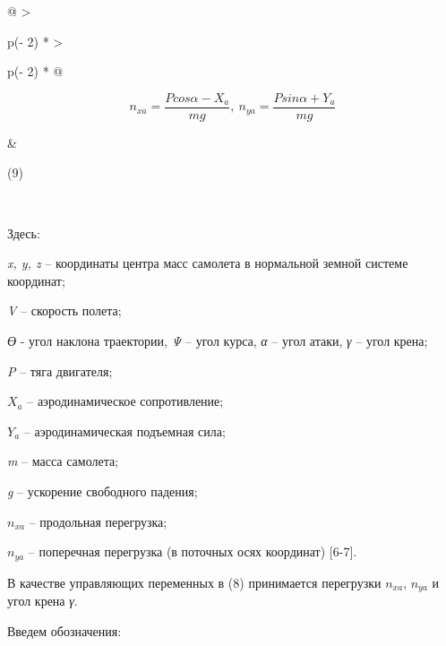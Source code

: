 \begin{longtable}[]{@{}
  >{\raggedright\arraybackslash}p{(\columnwidth - 2\tabcolsep) * }
  >{\raggedright\arraybackslash}p{(\columnwidth - 2\tabcolsep) * }@{}}
\toprule\noalign{}
\begin{minipage}[b]{\linewidth}\raggedright
\[n_{xa} = \frac{Pcos\alpha - X_{a}}{mg},\ n_{ya} = \frac{Psin\alpha + Y_{a}}{mg}\]
\end{minipage} & \begin{minipage}[b]{\linewidth}\raggedright
(9)
\end{minipage} \\
\midrule\noalign{}
\endhead
\bottomrule\noalign{}
\endlastfoot
\end{longtable}

Здесь:

\emph{x, y, z} -- координаты центра масс самолета в нормальной земной
системе координат;

\emph{V} -- скорость полета;

\emph{ϴ} - угол наклона траектории, \emph{Ψ} -- угол курса, \emph{α} --
угол атаки, \emph{γ} -- угол крена;

\emph{P} -- тяга двигателя;

\(X_{a}\) -- аэродинамическое сопротивление;

\(Y_{a}\) -- аэродинамическая подъемная сила;

\emph{m} -- масса самолета;

\emph{g} -- ускорение свободного падения;

\(n_{xa}\) -- продольная перегрузка;

\(n_{ya}\) -- поперечная перегрузка (в поточных осях координат)
{[}6-7{]}.

В качестве управляющих переменных в (8) принимается перегрузки
\(n_{xa}\), \(n_{ya}\) и угол крена \emph{γ}.

Введем обозначения:

